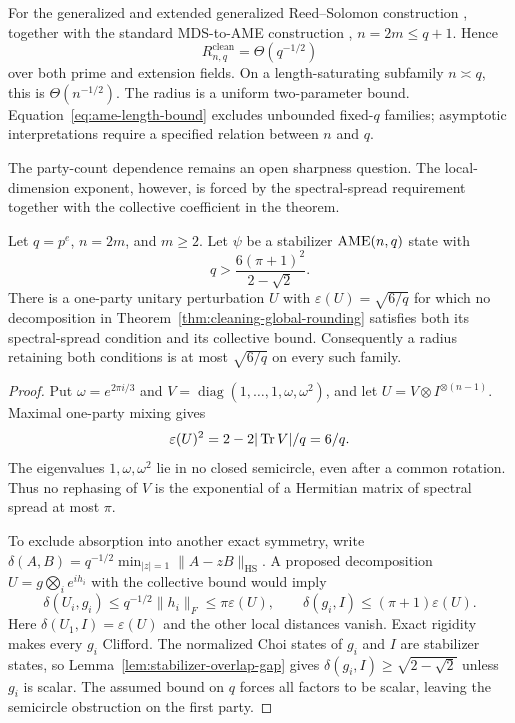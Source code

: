 For the generalized and extended generalized Reed--Solomon construction
\cite{SeroussiRoth1986}, together with the standard MDS-to-AME construction
\cite{RaissiGogolinRieraAcin2018}, \(n=2m\leq q+1\).  Hence
\[
 R^{\mathrm{clean}}_{n,q}=\Theta(q^{-1/2})                 \tag{6.11}
\]
over both prime and extension fields.  On a length-saturating subfamily
\(n\asymp q\), this is \(\Theta(n^{-1/2})\).
The radius is a uniform two-parameter bound.  Equation~\eqref{eq:ame-length-bound}
excludes unbounded fixed-\(q\) families; asymptotic interpretations require
a specified relation between \(n\) and \(q\).

The party-count dependence remains an open sharpness question.  The local-dimension
exponent, however, is forced by the spectral-spread requirement together
with the collective coefficient in the theorem.


\begin{proposition}
\label{prop:spectral-chart-obstruction}
Let \(q=p^e\), \(n=2m\), and \(m\geq2\).  Let \(\psi\) be a
stabilizer \(\mathrm{AME}(n,q)\) state with
\[
 q>\frac{6(\pi+1)^2}{2-\sqrt2}.
\]
There is a one-party unitary perturbation \(U\) with
\(\varepsilon(U)=\sqrt{6/q}\) for which no decomposition in
Theorem~\ref{thm:cleaning-global-rounding} satisfies both its spectral-spread
condition and its collective bound.  Consequently a radius retaining both
conditions is at most \(\sqrt{6/q}\) on every such family.
\end{proposition}

\begin{proof}
Put \(\omega=e^{2\pi i/3}\) and
\(V=\operatorname{diag}(1,\ldots,1,\omega,\omega^2)\), and let
\(U=V\otimes I^{\otimes(n-1)}\).  Maximal one-party mixing gives
\[
 \varepsilon(U)^2=2-2|\operatorname{Tr} V|/q=6/q.
\]
The eigenvalues \(1,\omega,\omega^2\) lie in no closed semicircle, even
after a common rotation.  Thus no rephasing of \(V\) is the exponential
of a Hermitian matrix of spectral spread at most \(\pi\).

To exclude absorption into another exact symmetry, write
\(\delta(A,B)=q^{-1/2}\min_{|z|=1}\|A-zB\|_{\mathrm{HS}}\).
A proposed decomposition \(U=g\bigotimes_i e^{ih_i}\) with the collective
bound would imply
\[
 \delta(U_i,g_i)\leq q^{-1/2}\|h_i\|_F\leq\pi\varepsilon(U),
 \qquad \delta(g_i,I)\leq(\pi+1)\varepsilon(U).
\]
Here \(\delta(U_1,I)=\varepsilon(U)\) and the other local distances vanish.
Exact rigidity makes every \(g_i\) Clifford.  The normalized Choi states
of \(g_i\) and \(I\) are stabilizer states, so
Lemma~\ref{lem:stabilizer-overlap-gap} gives
\(\delta(g_i,I)\geq\sqrt{2-\sqrt2}\) unless \(g_i\) is scalar.
The assumed bound on \(q\) forces all factors to be scalar, leaving the
semicircle obstruction on the first party.
\end{proof}

